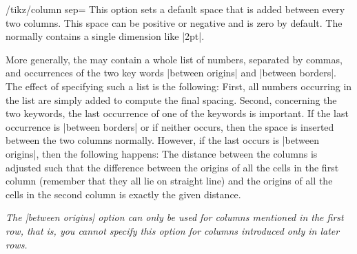 \begin{key}{/tikz/column sep=}
  This option sets a default space that is added between every two
  columns. This space can be positive or negative and is zero by
  default. The  normally contains a single
  dimension like |2pt|.
\begin{codeexample}[]
\end{codeexample}
  More generally, the  may contain a whole list of
  numbers, separated by commas, and occurrences of the two key words
  |between origins| and |between borders|. The effect of specifying
  such a list is the following: First, all numbers occurring in the
  list are simply added to compute the final spacing. Second,
  concerning the two keywords, the last occurrence of one of the keywords is
  important. If the last occurrence is |between borders| or if neither
  occurs, then the space is inserted between the two columns
  normally. However, if the last occurs is |between origins|, then the 
  following happens: The distance between the columns is adjusted such
  that the difference between the origins of all the cells in the
  first column (remember that they all lie on straight line) and the
  origins of all the cells in the second column is exactly the given
  distance.

  \emph{The |between origins| option can only be used for columns
    mentioned in the first row, that is, you cannot specify this
    option for columns introduced only in later rows.}
  
\begin{codeexample}[]
\end{codeexample}
\end{key}

